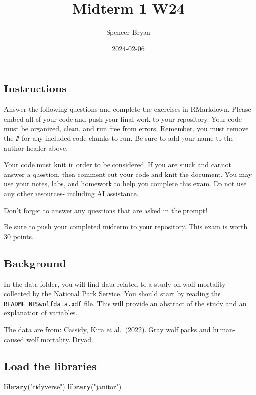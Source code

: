 \documentclass[
]{article}
\title{Midterm 1 W24}
\author{Spencer Bryan}
\date{2024-02-06}
\newenvironment{Shaded}{\begin{snugshade}}{\end{snugshade}}
\newcommand{\FunctionTok}[1]{\textcolor[rgb]{0.13,0.29,0.53}{\textbf{#1}}}
\newcommand{\NormalTok}[1]{#1}
\newcommand{\StringTok}[1]{\textcolor[rgb]{0.31,0.60,0.02}{#1}}
\begin{document}
\maketitle

\hypertarget{instructions}{%
\subsection{Instructions}\label{instructions}}

Answer the following questions and complete the exercises in RMarkdown.
Please embed all of your code and push your final work to your
repository. Your code must be organized, clean, and run free from
errors. Remember, you must remove the \texttt{\#} for any included code
chunks to run. Be sure to add your name to the author header above.

Your code must knit in order to be considered. If you are stuck and
cannot answer a question, then comment out your code and knit the
document. You may use your notes, labs, and homework to help you
complete this exam. Do not use any other resources- including AI
assistance.

Don't forget to answer any questions that are asked in the prompt!

Be sure to push your completed midterm to your repository. This exam is
worth 30 points.

\hypertarget{background}{%
\subsection{Background}\label{background}}

In the data folder, you will find data related to a study on wolf
mortality collected by the National Park Service. You should start by
reading the \texttt{README\_NPSwolfdata.pdf} file. This will provide an
abstract of the study and an explanation of variables.

The data are from: Cassidy, Kira et al.~(2022). Gray wolf packs and
human-caused wolf mortality.
\href{https://doi.org/10.5061/dryad.mkkwh713f}{Dryad}.

\hypertarget{load-the-libraries}{%
\subsection{Load the libraries}\label{load-the-libraries}}

\begin{Shaded}
\begin{Highlighting}[]
\FunctionTok{library}\NormalTok{(}\StringTok{"tidyverse"}\NormalTok{)}
\FunctionTok{library}\NormalTok{(}\StringTok{"janitor"}\NormalTok{)}
\end{Highlighting}
\end{Shaded}
\end{document}
